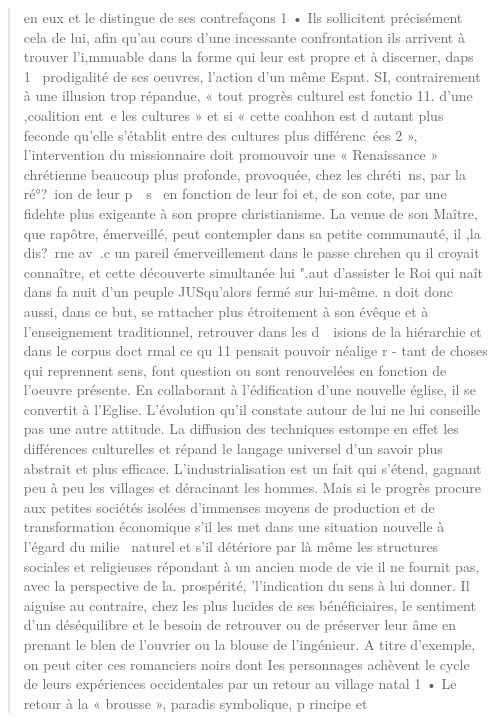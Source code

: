 \begin{quote}
en eux et le distingue de ses contrefaçons 1
• Ils
sollicitent précisément cela de lui, afin qu'au cours d'une
incessante confrontation ils arrivent à trouver l'i,mmuable
dans la forme qui leur est propre et à discerner, daps 1~
prodigalité de ses oeuvres, l'action d'un même Espnt. SI,
contrairement à une illusion trop répandue, « tout progrès
culturel est fonctio 11. d'une ,coalition ent~e les
cultures » et si « cette coahhon est d autant plus feconde
qu'elle s'établit entre des cultures plus différenc~ées 2 »,
l'intervention du missionnaire doit promouvoir une
« Renaissance » chrétienne beaucoup plus profonde, provoquée,
chez les chréti~ns, par la  ré°?~ion de leur p~~s~
en fonction de leur foi et, de son cote, par une fidehte
plus exigeante à son propre christianisme.
La venue de son Maître, que rapôtre, émerveillé, peut
contempler dans sa petite communauté, il ,la dis?~rne av~.c
un pareil émerveillement dans le passe chrehen qu il
croyait connaître, et cette découverte simultanée lui ".aut
d'assister le Roi qui naît dans fa nuit d'un peuple JUSqu'alors
fermé sur lui-même. n doit donc aussi, dans ce
but, se rattacher plus étroitement à son évêque et à
l'enseignement traditionnel,  retrouver dans les d~~isions
de la hiérarchie et dans le corpus doct rmal ce qu 11 pensait
pouvoir néalige r - tant de choses qui reprennent
sens, font question ou sont renouvelées en fonction de l'oeuvre présente. En collaborant à l'édification d'une
nouvelle église, il se convertit à l'Eglise. 
L'évolution qu'il constate autour de lui ne lui conseille
pas une autre attitude. La diffusion des techniques
estompe en effet les différences culturelles et  répand le
langage universel d'un savoir plus abstrait et plus efficace.
L'industrialisation est un fait qui s'étend, gagnant
peu à peu les villages et déracinant les hommes. Mais si
le progrès procure aux petites sociétés isolées d'immenses
moyens de production et de transformation économique
s'il les met dans une situation nouvelle à l'égard du milie~
naturel et s'il détériore par là même les structures sociales
et religieuses répondant à un ancien mode de vie il ne
fournit pas, avec la perspective de la. prospérité, 'l'indication
du sens à lui donner. Il aiguise au contraire, chez
les plus lucides de ses bénéficiaires, le sentiment d'un
déséquilibre et le besoin de retrouver ou de préserver leur
âme en prenant le blen de l'ouvrier ou la blouse de l'ingénieur.
A titre d'exemple, on peut citer ces romanciers
noirs dont Ies personnages achèvent le cycle de leurs expériences
occidentales par un retour au village natal 1 • Le
retour à la « brousse », paradis symbolique, p rincipe et

\end{quote}
